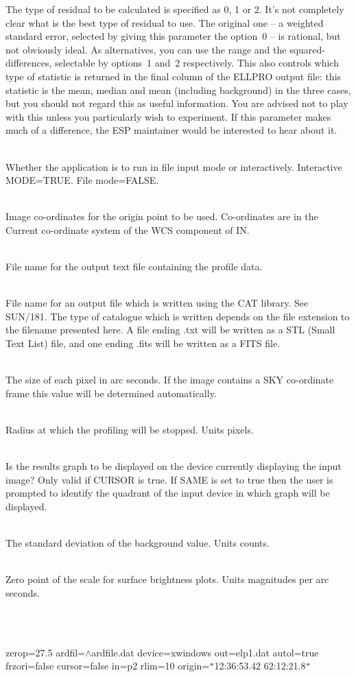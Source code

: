 \documentclass[twoside,11pt]{article}
\newcommand{\LineBreak}{\hfill\break\hbox{}\qquad}
\newlength{\sstexampleslength}
\newcommand{\sstexamples}[1]{
   \item[Examples:] \mbox{} \\
   \vspace{-3.5ex}
   \begin{description}
      #1
   \end{description}
}
\newcommand{\sstsubsection}[1]{ \item[{#1}] \mbox{} \\}
\newcommand{\sstexamplesubsection}[2]{\sloppy
\item[\parbox{\sstexampleslength}{\ssttt #1}] \mbox{} \vspace{1.0ex}
\\ #2 }
\newcommand{\sstexamples}[1]{
      \item[Examples:] \\
      \begin{description}
         #1
      \end{description}
      \\
   }
\newcommand{\sstsubsection}[1]{\item[{#1}]}
\newcommand{\sstexamplesubsection}[2]{\item[{\ssttt #1}] #2}
\begin{document}
{{{        The type of residual to be calculated is specified as 0, 1 or
        2.  It's not
        completely clear what is the best type of residual to use.  The
        original one -- a weighted standard error, selected by giving
        this parameter the option~0 -- is rational, but not obviously
        ideal.  As alternatives, you can use the range and the
        squared-differences, selectable by options~1 and~2 respectively.
        This also controls which type of statistic is returned in
        the final column of the ELLPRO output file: this statistic is
        the mean, median and mean (including background) in the three
        cases, but you should not regard this as useful information.
        You are advised not to play with this unless you particularly wish to
        experiment.  If this parameter makes much of a difference, the
        ESP maintainer would be interested to hear about it.
      }
      \sstsubsection{
         MODE=\_LOGICAL (Read)
      }{
         Whether the application is to run in file input mode or
         interactively. Interactive MODE=TRUE. File mode=FALSE.
      }
      \sstsubsection{
         ORIGIN=\_REAL (Read)
      }{
         Image co-ordinates for the origin point to be used.  Co-ordinates
         are in the Current co-ordinate system of the WCS component
         of IN.
      }
      \sstsubsection{
         OUT=\_CHAR (Read)
      }{
         File name for the output text file containing the profile
         data.
      }
      \sstsubsection{
         OUTCAT=\_CHAR (Read)
      }{
         File name for an output file which is written using the CAT
         library.  See SUN/181.  The type of catalogue which is written
         depends on the file extension to the filename presented here.
         A file ending .txt will be written as a STL (Small Text List)
         file, and one ending .fits will be written as a FITS file.
      }
      \sstsubsection{
         PSIZE=\_REAL (Read)
      }{
         The size of each pixel in arc seconds.  If the image contains
         a SKY co-ordinate frame this value will be determined
         automatically.
      }
      \sstsubsection{
         RLIM=\_REAL (Read)
      }{
         Radius at which the profiling will be stopped. Units pixels.
      }
      \sstsubsection{
         SAME=\_LOGICAL (Read)
      }{
         Is the results graph to be displayed on the device currently
         displaying the input image? Only valid if CURSOR is true.
         If SAME is set to true then the user is prompted to identify
         the quadrant of the input device in which graph will be
         displayed.
      }
      \sstsubsection{
         SIGMA=\_REAL (Read)
      }{
         The standard deviation of the background value. Units counts.
      }
      \sstsubsection{
         ZEROP=\_REAL (Read)
      }{
         Zero point of the scale for surface brightness plots. Units
         magnitudes per arc seconds.
      }
   }
   \sstexamples{
      \sstexamplesubsection{
         ellpro mode=true back=6200 sigma=390
      }{
             zerop=27.5 ardfil=$\wedge$ardfile.dat device=xwindows
\LineBreak
             out=elp1.dat autol=true frzori=false cursor=false
\LineBreak
             in=p2 rlim=10 origin={\tt "}12:36:53.42 62:12:21.8{\tt "}

}}}
\end{document}
